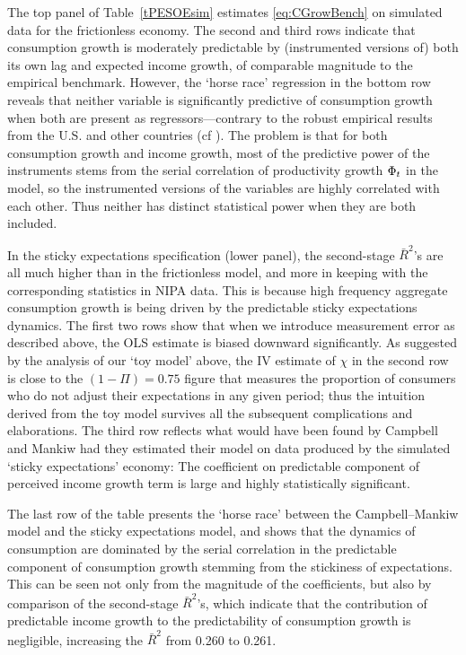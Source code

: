 The top panel of Table~\ref{tPESOEsim} estimates \eqref{eq:CGrowBench} on simulated data for the frictionless economy.  The second and third rows indicate that consumption growth is moderately predictable by (instrumented versions of) both its own lag and expected income growth, of comparable magnitude to the empirical benchmark.  However, the `horse race' regression in the bottom row reveals that neither variable is significantly predictive of consumption growth when both are present as regressors---contrary to the robust empirical results from the U.S. and other countries (cf \cite{cssIntlStickyC}).  The problem is that for both consumption growth and income growth, most of the predictive power of the instruments stems from the serial correlation of productivity growth $\Phi_t$ in the model, so the instrumented versions of the variables are highly correlated with each other.  Thus neither has distinct statistical power when they are both included.

In the sticky expectations specification (lower panel), the second-stage $\bar{R}^{2}$'s are all much higher than in the frictionless model, and more in keeping with the corresponding statistics in NIPA data. This is because high frequency aggregate consumption growth is being driven by the predictable sticky expectations dynamics. The first two rows show that when we introduce measurement error as described above, the OLS estimate is biased downward significantly. As suggested by the analysis of our `toy model' above, the IV estimate of $\chi$ in the second row is close to the $(1-\Pi)=0.75$ figure that measures the proportion of consumers who do not adjust their expectations in any given period; thus the intuition derived from the toy model survives all the subsequent complications and elaborations. The third row reflects what would have been found by Campbell and Mankiw had they estimated their model on data produced by the simulated `sticky expectations' economy:  The coefficient on predictable component of perceived income growth term is large and highly statistically significant.

The last row of the table presents the `horse race' between the Campbell--Mankiw model and the sticky expectations model, and shows that the dynamics of consumption are dominated by the serial correlation in the predictable component of consumption growth stemming from the stickiness of expectations.  This can be seen not only from the magnitude of the coefficients, but also by comparison of the second-stage $\bar{R}^{2}$'s, which indicate that the contribution of predictable income growth to the predictability of consumption growth is negligible, increasing the $\bar{R}^2$ from 0.260 to 0.261.


